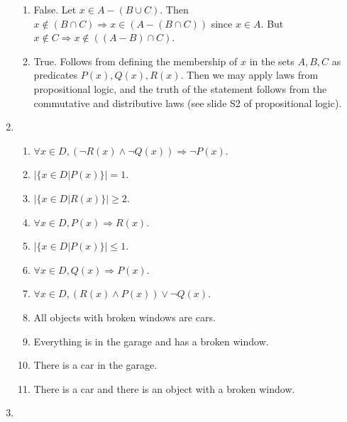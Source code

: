 \documentclass[10pt]{article}
\theoremstyle{plain}
\theoremstyle{definition}
\begin{document}
\begin{enumerate}
\begin{enumerate}
\item False. Let $x \in A - (B \cup C)$. Then $x \notin (B \cap C) \Rightarrow x \in (A - (B \cap C))$ since $x \in A$. But $x \notin C \Rightarrow x \notin ((A - B) \cap C)$. 

\item True. Follows from defining the membership of $x$ in the sets $A,B,C$ as predicates $P(x), Q(x), R(x)$. Then we may apply laws from propositional logic, and the truth of the statement follows from the commutative and distributive laws (see slide S2 of propositional logic). 




\end{enumerate}

\item 

\begin{enumerate}

\item $\forall x \in D, (\neg R(x) \wedge \neg Q(x)) \Rightarrow \neg P(x)$. 

\item $|\{x \in D | P(x)\}| = 1$. 

\item $|\{x \in D | R(x)\}| \geq 2$. 

\item $\forall x \in D, P(x) \Rightarrow R(x)$. 

\item $|\{x \in D | P(x)\}| \leq 1$. 

\item $\forall x \in D, Q(x) \Rightarrow P(x)$. 

\item $\forall x \in D, (R(x) \wedge P(x)) \vee \neg Q(x)$. 

\item All objects with broken windows are cars. 

\item Everything is in the garage and has a broken window. 

\item There is a car in the garage. 

\item There is a car and there is an object with a broken window. 


\end{enumerate}



\item 


\end{enumerate}
\end{document}
